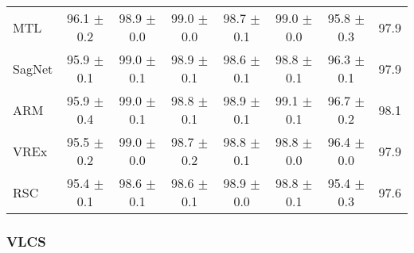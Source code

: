 \documentclass{article}
\begin{document}
\begin{center}
{\begin{tabular}{lccccccc}
MTL                  & 96.1 $\pm$ 0.2       & 98.9 $\pm$ 0.0       & 99.0 $\pm$ 0.0       & 98.7 $\pm$ 0.1       & 99.0 $\pm$ 0.0       & 95.8 $\pm$ 0.3       & 97.9                 \\
SagNet               & 95.9 $\pm$ 0.1       & 99.0 $\pm$ 0.1       & 98.9 $\pm$ 0.1       & 98.6 $\pm$ 0.1       & 98.8 $\pm$ 0.1       & 96.3 $\pm$ 0.1       & 97.9                 \\
ARM                  & 95.9 $\pm$ 0.4       & 99.0 $\pm$ 0.1       & 98.8 $\pm$ 0.1       & 98.9 $\pm$ 0.1       & 99.1 $\pm$ 0.1       & 96.7 $\pm$ 0.2       & 98.1                 \\
VREx                 & 95.5 $\pm$ 0.2       & 99.0 $\pm$ 0.0       & 98.7 $\pm$ 0.2       & 98.8 $\pm$ 0.1       & 98.8 $\pm$ 0.0       & 96.4 $\pm$ 0.0       & 97.9                 \\
RSC                  & 95.4 $\pm$ 0.1       & 98.6 $\pm$ 0.1       & 98.6 $\pm$ 0.1       & 98.9 $\pm$ 0.0       & 98.8 $\pm$ 0.1       & 95.4 $\pm$ 0.3       & 97.6                 \\
\bottomrule
\end{tabular}}
\end{center}

\subsubsection{VLCS}
\end{document}
